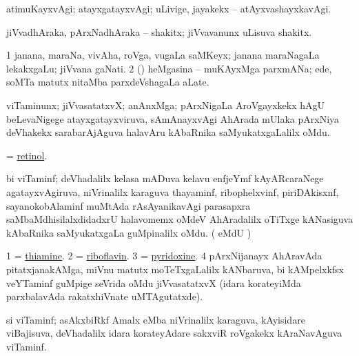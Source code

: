 \bentry 
{} 
\gl{\kirxvi}
\expl{}
\bmng
 atimuKayxvAgi; atayxgatayxvAgi; uLivige, jayakekx -- atAyxvashayxkavAgi. 
\emng
\eentry

\bentry 
{}
\gl{\nA}
\expl{}
\bmng
 jiVvadhAraka, pArxNadhAraka -- shakitx; jiVvavanunx uLisuva shakitx. 
\emng
\eentry

\bentry 
{}
\gl{\nA}
\expl{}
\bmng
\bnum
\num{1} janana, maraNa, vivAha, roVga, \mo vugaLa saMKeyx; janana maraNagaLa lekakxgaLu; jiVvana gaNati. 
\num{2} (\AmA) heMgasina -- muKAyxMga parxmANa; ede, soMTa matutx nitaMba parxdeVshagaLa aLate. 
\enum
\emng
\eentry

\bentry
{} 
\gl{\nA}
\expl{}
\bmng
 viTaminunx; jiVvasatatxvX; anAnxMga; pArxNigaLa AroVgayxkekx hAgU beLevaNigege atayxgatayxviruva, sAmAnayxvAgi AhArada mUlaka pArxNiya deVhakekx sarabarAjAguva halavAru kAbaRnika saMyukatxgaLalilx oMdu. 
\emng
\eentry

\bentry 
{}
\gl{\nA}
\expl{}
\bmng
 = \hyperref{kandict_r.pdf}{R}{retinol}{retinol}. 
\emng
\eentry

\bentry 
{}
\gl{\nA}
\expl{}
\bmng
 bi viTaminf; deVhadalilx kelasa mADuva kelavu enfjeYmf kAyARcaraNege agatayxvAgiruva, niVrinalilx karaguva thayaminf, ribophelxvinf, piriDAkisxnf, sayanokobAlaminf muMtAda rAsAyanikavAgi parasapxra saMbaMdhisilalxdidadxrU halavomemx oMdeV AhAradalilx oTiTxge kANasiguva kAbaRnika saMyukatxgaLa guMpinalilx oMdu. (  eMdU \parx) 
\emng

\noindent 
\gl{\pagu}
\expl{}
\bmng
\bnum
\num{1} = \hyperref{kandict_t.pdf}{T}{thiamine}{thiamine}. 
\num{2} = \hyperref{kandict_r.pdf}{R}{riboflavin}{riboflavin}. 
\num{3} = \hyperref{kandict_p.pdf}{P}{pyridoxine}{pyridoxine}. 
\num{4} pArxNijanayx AhAravAda pitatxjanakAMga, miVnu matutx moTeTxgaLalilx kANbaruva, bi kAMpelxkfsx veYTaminf guMpige seVrida oMdu jiVvasatatxvX (idara korateyiMda parxbalavAda rakatxhiVnate uMTAgutatxde). 
\enum
\emng
\eentry

\bentry
{}
\gl{\nA}
\expl{}
\bmng
 si viTaminf; asAkxbiRkf Amalx eMba niVrinalilx karaguva, kAyisidare viBajisuva, deVhadalilx idara korateyAdare sakxviR roVgakekx kAraNavAguva viTaminf. 
\emng
\eentry

